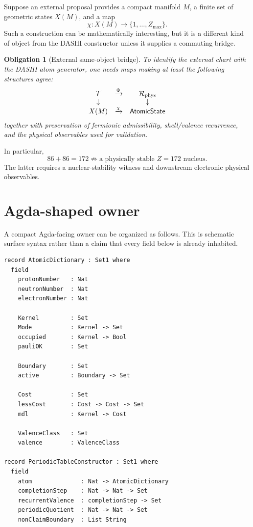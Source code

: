 \documentclass[11pt,a4paper]{article}
\newtheorem{obligation}[definition]{Obligation}
\theoremstyle{remark}
\newcommand{\T}{\mathcal T}
\newcommand{\Rphys}{\mathcal R_{\rm phys}}
\begin{document}
Suppose an external proposal provides a compact manifold $M$, a finite set of
geometric states $X(M)$, and a map
\[
 \chi:X(M)\to\{1,\ldots,Z_{\max}\}.
\]
Such a construction can be mathematically interesting, but it is a different
kind of object from the DASHI constructor unless it supplies a commuting bridge.

\begin{obligation}[External same-object bridge]
To identify the external chart with the DASHI atom generator, one needs maps
making at least the following structures agree:
\[
\begin{array}{ccc}
\T & \xrightarrow{\Phi} & \Rphys\\
\downarrow && \downarrow\\
X(M) & \xrightarrow{\chi} & \mathsf{AtomicState}
\end{array}
\]
together with preservation of fermionic admissibility, shell/valence recurrence,
and the physical observables used for validation.
\end{obligation}

In particular,
\[
 86+86=172
 \not\Rightarrow
 \text{a physically stable }Z=172\text{ nucleus}.
\]
The latter requires a nuclear-stability witness and downstream electronic
physical observables.

\section{Agda-shaped owner}

A compact Agda-facing owner can be organized as follows.  This is schematic
surface syntax rather than a claim that every field below is already inhabited.

\begin{verbatim}
record AtomicDictionary : Set1 where
  field
    protonNumber   : Nat
    neutronNumber  : Nat
    electronNumber : Nat

    Kernel         : Set
    Mode           : Kernel -> Set
    occupied       : Kernel -> Bool
    pauliOK        : Set

    Boundary       : Set
    active         : Boundary -> Set

    Cost           : Set
    lessCost       : Cost -> Cost -> Set
    mdl            : Kernel -> Cost

    ValenceClass   : Set
    valence        : ValenceClass

record PeriodicTableConstructor : Set1 where
  field
    atom              : Nat -> AtomicDictionary
    completionStep    : Nat -> Nat -> Set
    recurrentValence  : completionStep -> Set
    periodicQuotient  : Nat -> Nat -> Set
    nonClaimBoundary  : List String
\end{verbatim}
\end{document}
